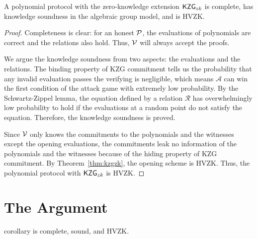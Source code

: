 
\begin{theorem}
\label{thm:polyproto}
A polynomial protocol with the zero-knowledge extension $\mathsf{KZG}_{zk}$ is complete, has knowledge soundness in the algebraic group model, and is HVZK.
\end{theorem}

\begin{proof}
Completeness is clear: for an honest $\mathcal{P}$, the evaluations of polynomials are correct and the relations also hold. Thus, $\mathcal{V}$ will always accept the proofs.

We argue the knowledge soundness from two aspects: the evaluations and the relations. The binding property of KZG commitment tells us the probability that any invalid evaluation passes the verifying is negligible, which means $\mathcal{A}$ can win the first condition of the attack game with extremely low probability. By the Schwartz-Zippel lemma, the equation defined by a relation $\mathcal{R}$ has overwhelmingly low probability to hold if the evaluations at a random point do not satisfy the equation. Therefore, the knowledge soundness is proved.

Since $\mathcal{V}$ only knows the commitments to the polynomials and the witnesses except the opening evaluations, the commitments leak no information of the polynomials and the witnesses because of the hiding property of KZG commitment. By Theorem~\ref{thm:kzgzk}, the opening scheme is HVZK. Thus, the polynomial protocol with $\mathsf{KZG}_{zk}$ is HVZK.
\end{proof}


\section{The \bootstrap Argument}

\begin{restatable}{corollary}{}
\label{thm:keys}
\bootstrap is complete, sound, and HVZK.
\end{restatable}

